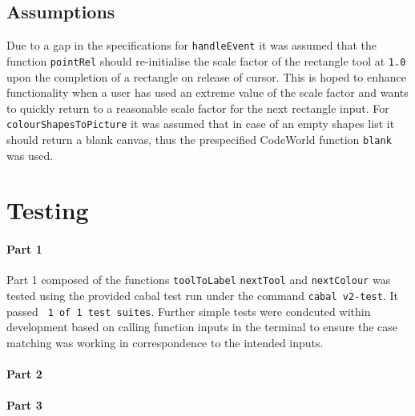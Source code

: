 \documentclass[11pt]{article}
\begin{document}
\subsection{Assumptions}%
Due to a gap in the specifications for \verb|handleEvent| it was assumed that the function \verb|pointRel| should re-initialise the scale factor of the rectangle tool at \verb|1.0| upon the completion of a rectangle on release of cursor. This is hoped to enhance functionality when a user has used an extreme value of the scale factor and wants to quickly return to a reasonable scale factor for the next rectangle input. For \verb|colourShapesToPicture| it was assumed that in case of an empty shapes list it should return a blank canvas, thus the prespecified CodeWorld function \verb|blank| was used.


\section{Testing}%
\paragraph{Part 1}
Part 1 composed of the functions \verb|toolToLabel| \verb|nextTool| and \verb|nextColour| was tested using the provided cabal test run under the command \verb|cabal v2-test|. It passed \verb| 1 of 1 test suites|. Further simple tests were condcuted within development based on calling function inputs in the terminal to ensure the case matching was working in correspondence to the intended inputs. 
\paragraph{Part 2} 

\paragraph{Part 3}



\end{document}
